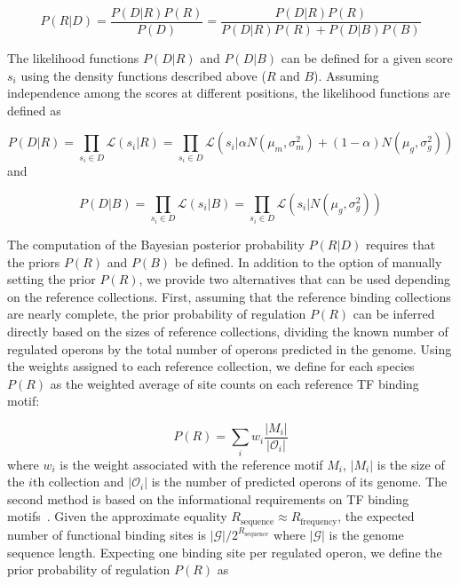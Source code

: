\begin{equation}
P(R|D) = \frac{P(D|R)P(R)}{P(D)} = \frac{P(D|R)P(R)}{P(D|R)P(R) + P(D|B)P(B)}
\end{equation}

The likelihood functions $P(D|R)$ and $P(D|B)$ can be defined for a given score
$s_i$ using the density functions described above ($R$ and $B$). Assuming
independence among the scores at different positions, the likelihood functions
are defined as

\begin{equation}
  P(D|R) = \prod_{s_i \in D} \mathcal{L}(s_i|R) =
  \prod_{s_i \in D} \mathcal{L}(s_i | \alpha N(\mu_m, \sigma_m^2) + (1-\alpha)N(\mu_g,\sigma_g^2))
\end{equation}
and

\begin{equation}
  P(D|B) = \prod_{s_i \in D} \mathcal{L}(s_i|B) = \prod_{s_i \in D} \mathcal{L}(s_i | N(\mu_g, \sigma_g^2))
\end{equation}

The computation of the Bayesian posterior probability $P(R|D)$ requires that
the priors $P(R)$ and $P(B)$ be defined. In addition to the option of manually
setting the prior $P(R)$, we provide two alternatives that can be used
depending on the reference collections. First, assuming that the reference
binding collections are nearly complete, the prior probability of regulation
$P(R)$ can be inferred directly based on the sizes of reference collections,
dividing the known number of regulated operons by the total number of operons
predicted in the genome. Using the weights assigned to each reference
collection, we define for each species $P(R)$ as the weighted average of site counts on each
reference TF binding motif:

\begin{equation}
P(R) = \sum_i w_i \frac{|M_i|}{|\mathcal{O}_i|}
\end{equation}
where $w_i$ is the weight associated with the reference motif $M_i$, $|M_i|$ is
the size of the $i$th collection and $|\mathcal{O}_i|$ is the number of
predicted operons of its genome. The second method is based on the
informational requirements on TF binding motifs~\citep{schneider1986information,
  schneider2000evolution, o2014informational}. Given the approximate equality
$R_{\mathrm{sequence}} \approx R_{\mathrm{frequency}}$, the expected number of
functional binding sites is $|\mathcal{G}| / 2^{R_{\mathrm{sequence}}}$ where
$|\mathcal{G}|$ is the genome sequence length. Expecting one binding site per
regulated operon, we define the prior probability of regulation $P(R)$ as

